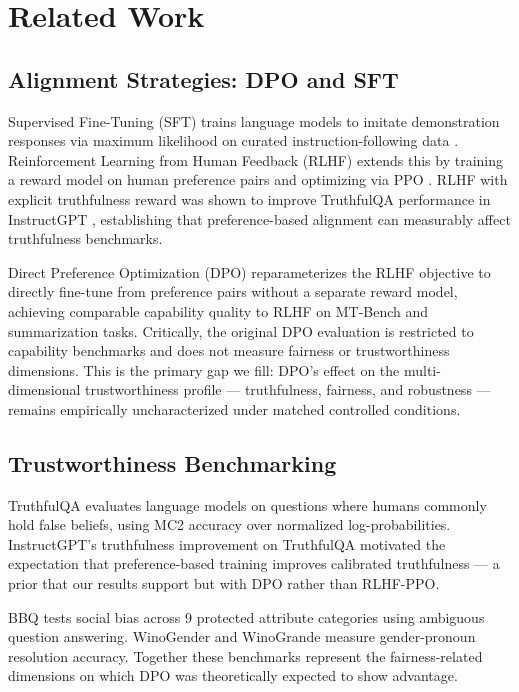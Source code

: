\section{Related Work}
\label{sec:related}

\subsection{Alignment Strategies: DPO and SFT}

Supervised Fine-Tuning (SFT) trains language models to imitate demonstration responses
via maximum likelihood on curated instruction-following data \cite{Wei2022Finetuned,Chung2022Scaling}.
Reinforcement Learning from Human Feedback (RLHF) extends this by training a reward model
on human preference pairs and optimizing via PPO \cite{Ouyang2022Training}. RLHF with explicit
truthfulness reward was shown to improve TruthfulQA performance in InstructGPT \cite{Ouyang2022Training},
establishing that preference-based alignment can measurably affect truthfulness benchmarks.

Direct Preference Optimization (DPO) \cite{Rafailov2023Direct} reparameterizes the RLHF
objective to directly fine-tune from preference pairs without a separate reward model, achieving
comparable capability quality to RLHF on MT-Bench and summarization tasks. Critically, the
original DPO evaluation is restricted to capability benchmarks and does not measure fairness
or trustworthiness dimensions. This is the primary gap we fill: DPO's effect on the
multi-dimensional trustworthiness profile --- truthfulness, fairness, and robustness --- remains
empirically uncharacterized under matched controlled conditions.

\subsection{Trustworthiness Benchmarking}

TruthfulQA \cite{Lin2022TruthfulQA} evaluates language models on questions where humans commonly
hold false beliefs, using MC2 accuracy over normalized log-probabilities. InstructGPT's
truthfulness improvement \cite{Ouyang2022Training} on TruthfulQA motivated the expectation that
preference-based training improves calibrated truthfulness --- a prior that our results support
but with DPO rather than RLHF-PPO.

BBQ \cite{Parrish2022BBQ} tests social bias across 9 protected attribute categories using
ambiguous question answering. WinoGender \cite{Rudinger2018Gender} and WinoGrande \cite{Sakaguchi2021WinoGrande}
measure gender-pronoun resolution accuracy. Together these benchmarks represent
the fairness-related dimensions on which DPO was theoretically expected to show advantage.

